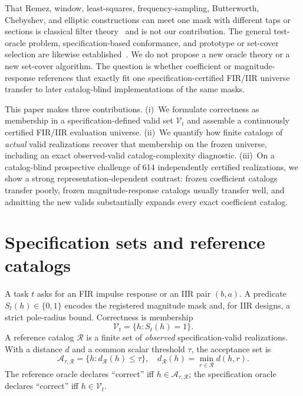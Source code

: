 \documentclass{article}
\begin{document}
That Remez, window, least-squares, frequency-sampling, Butterworth,
Chebyshev, and elliptic constructions can meet one mask with
different taps or sections is classical filter
theory~\cite{kaiser1974window,harris1978windows,rabiner1970freqsamp,parks1972chebyshev,mcclellan1973computer,rabiner1975fir,butterworth1930,constantinides1970,jackson1996filters,antoniou2006filters}
and is not our contribution.
The general test-oracle problem, specification-based conformance,
and prototype or set-cover selection are likewise
established~\cite{weyuker1982nontestable,barr2015oracle,huuhtanen2015dsp,hart1968cnn,chvatal1979setcover}.
We do not propose a new oracle theory or a new set-cover algorithm.
The question is whether coefficient or magnitude-response
references that exactly fit one specification-certified FIR/IIR
universe transfer to later catalog-blind implementations of the
same masks.

This paper makes three contributions.
(i)~We formulate correctness as membership in a
specification-defined valid set $\mathcal{V}_t$ and assemble a
continuously certified FIR/IIR evaluation universe.
(ii)~We quantify how finite catalogs of \emph{actual} valid
realizations recover that membership on the frozen universe,
including an exact observed-valid catalog-complexity diagnostic.
(iii)~On a catalog-blind prospective challenge of 614 independently
certified realizations, we show a strong
representation-dependent contrast: frozen coefficient catalogs
transfer poorly, frozen magnitude-response catalogs usually
transfer well, and admitting the new valids substantially expands
every exact coefficient catalog.

\section{Specification sets and reference catalogs}
\label{sec:form}

A task $t$ asks for an FIR impulse response or an IIR pair
$(b,a)$.
A predicate $S_t(h)\in\{0,1\}$ encodes the registered magnitude
mask and, for IIR designs, a strict pole-radius bound.
Correctness is membership
\begin{equation}
\mathcal{V}_t=\{h:S_t(h)=1\}.
\label{eq:vt}
\end{equation}
A reference catalog $\mathcal{R}$ is a finite set of
\emph{observed} specification-valid realizations.
With a distance $d$ and a common scalar threshold $\tau$, the
acceptance set is
\begin{equation}
\mathcal{A}_{\tau,\mathcal{R}}=\{h:d_{\mathcal{R}}(h)\le\tau\},
\quad
d_{\mathcal{R}}(h)=\min_{r\in\mathcal{R}}d(h,r).
\label{eq:A}
\end{equation}
The reference oracle declares ``correct'' iff
$h\in\mathcal{A}_{\tau,\mathcal{R}}$; the specification oracle
declares ``correct'' iff $h\in\mathcal{V}_t$.
\end{document}

